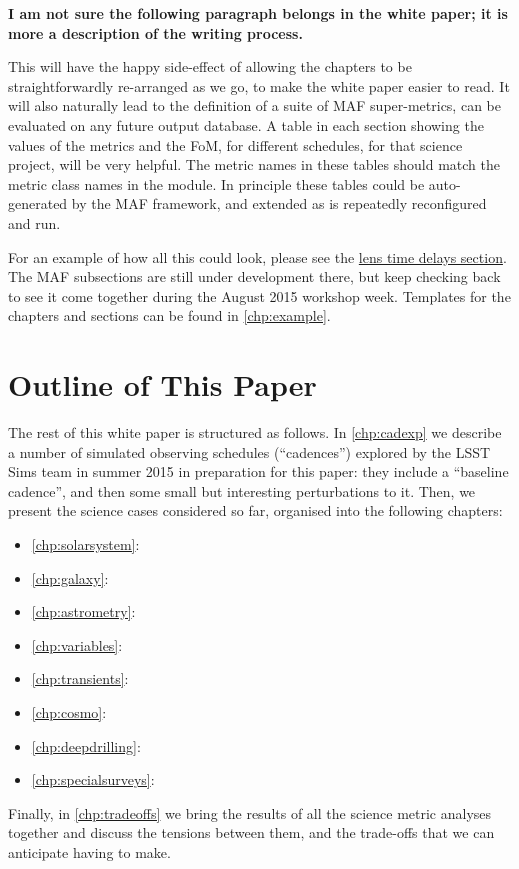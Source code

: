 {\bf I am not sure the following paragraph belongs in the white paper;
  it is more a description of the writing process.}

This will have the happy side-effect of allowing the chapters to be
straightforwardly re-arranged as we go, to make the white paper easier
to read. It will also naturally lead to the definition of a suite of
MAF  super-metrics, can be evaluated on any future \OpSim output
database.  A table in each section showing the values of the metrics
and the FoM, for different schedules, for that science project, will
be very helpful. The metric names in these tables should match the
metric class names in the
\href{https://github.com/LSST-nonproject/sims_maf_contrib/wiki}{\simsMafContrib}
module. In principle these tables could be auto-generated by the MAF
framework, and extended as \OpSim is repeatedly reconfigured and run.

For an example of how all this could look, please see the
\hyperref[sec:lenstimedelays]{lens
time delays section}. The MAF subsections are still under development
there, but keep checking back to see it come together during the
August 2015 workshop week. Templates for the chapters and sections can
be found in \autoref{chp:example}.



\section{Outline of This Paper}
\def\secname{intro:outline}\label{sec:\secname}

The rest of this white paper is structured as follows. In
\autoref{chp:cadexp} we describe a number of \OpSim simulated observing
schedules (``cadences'') explored by the LSST Sims team in summer 2015
in preparation for this paper: they include a ``baseline cadence'', and
then some small but interesting perturbations to it. Then, we present
the science cases considered so far, organised into the following
chapters:

\begin{itemize}
    \item \autoref{chp:solarsystem}: 
    \item \autoref{chp:galaxy}: 
    \item \autoref{chp:astrometry}: 
    \item \autoref{chp:variables}: 
    \item \autoref{chp:transients}: 
    \item \autoref{chp:cosmo}: 
    \item \autoref{chp:deepdrilling}: 
    \item \autoref{chp:specialsurveys}: 
\end{itemize}

Finally, in \autoref{chp:tradeoffs} we bring the results of all the
science metric analyses  together and discuss the tensions between
them, and the trade-offs that we can anticipate having to make.

\navigationbar

